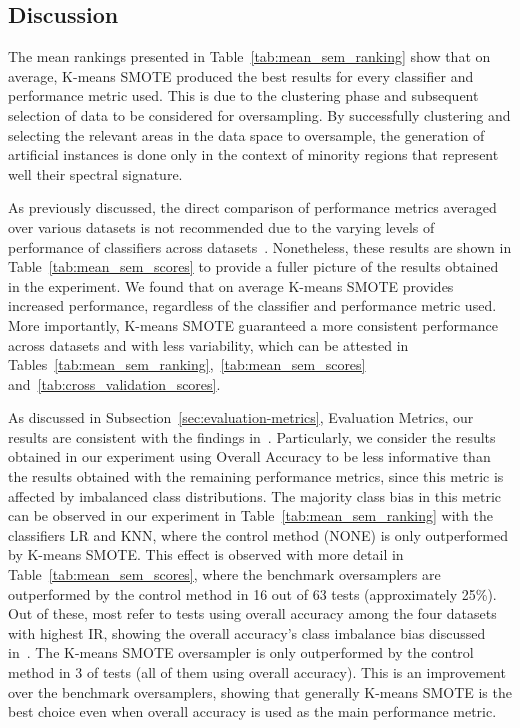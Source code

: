 \documentclass[authoryear,preprint,12pt]{elsarticle}
\begin{document}
\begin{linenumbers}
\subsection{Discussion}

The mean rankings presented in Table~\ref{tab:mean_sem_ranking} show that on
average, K-means SMOTE produced the best results for every classifier and
performance metric used. This is due to the clustering phase and subsequent
selection of data to be considered for oversampling. By successfully
clustering and selecting the relevant areas in the data space to oversample,
the generation of artificial instances is done only in the context of minority
regions that represent well their spectral signature.

As previously discussed, the direct comparison of performance metrics averaged
over various datasets is not recommended due to the varying levels of
performance of classifiers across datasets~\citep{demvsar2006}. Nonetheless,
these results are shown in Table~\ref{tab:mean_sem_scores} to provide a fuller
picture of the results obtained in the experiment. We found that on average
K-means SMOTE provides increased performance, regardless of the classifier and
performance metric used. More importantly, K-means SMOTE guaranteed a more
consistent performance across datasets and with less variability, which can be
attested in Tables~\ref{tab:mean_sem_ranking},~\ref{tab:mean_sem_scores}
and~\ref{tab:cross_validation_scores}. 

As discussed in Subsection~\ref{sec:evaluation-metrics}, Evaluation Metrics,
our results are consistent with the findings in~\citep{Olofsson2013,
Pontius2011}. Particularly, we consider the results obtained in our experiment
using Overall Accuracy to be less informative than the results obtained with
the remaining performance metrics, since this metric is affected by imbalanced
class distributions. The majority class bias in this metric can be observed
in our experiment in Table~\ref{tab:mean_sem_ranking} with the classifiers LR
and KNN, where the control method (NONE) is only outperformed by K-means
SMOTE. This effect is observed with more detail in
Table~\ref{tab:mean_sem_scores}, where the benchmark oversamplers are
outperformed by the control method in 16 out of 63 tests (approximately 25\%).
Out of these, most refer to tests using overall accuracy among the four
datasets with highest IR, showing the overall accuracy's class imbalance bias
discussed in~\citep{Olofsson2013, Pontius2011}. The K-means SMOTE oversampler
is only outperformed by the control method in 3 of tests (all of them using
overall accuracy). This is an improvement over the benchmark oversamplers,
showing that generally K-means SMOTE is the best choice even when overall
accuracy is used as the main performance metric.


\end{linenumbers}
\end{document}
